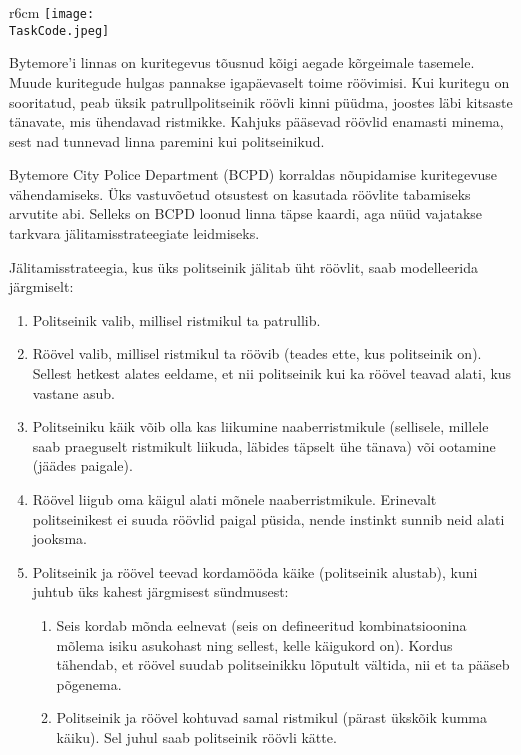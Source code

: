 \documentclass{boi2014-et}
\renewcommand{\TaskCode}{coprobber}
\begin{document}
    \begin{wrapfigure}[8]{r}{6cm}
        \vspace{-36pt}
        \texttt{[image: \\TaskCode.jpeg]}
    \end{wrapfigure}

    Bytemore'i linnas on kuritegevus tõusnud kõigi aegade kõrgeimale tasemele.
    Muude kuritegude hulgas pannakse igapäevaselt toime röövimisi.
    Kui kuritegu on sooritatud, peab üksik patrullpolitseinik röövli kinni püüdma,
    joostes läbi kitsaste tänavate, mis ühendavad ristmikke.
    Kahjuks pääsevad röövlid enamasti minema,
    sest nad tunnevad linna paremini kui politseinikud.

    Bytemore City Police Department (BCPD) korraldas nõupidamise kuritegevuse vähendamiseks.
    Üks vastuvõetud otsustest on kasutada röövlite tabamiseks arvutite abi.
    Selleks on BCPD loonud linna täpse kaardi,
    aga nüüd vajatakse tarkvara jälitamisstrateegiate leidmiseks.

    Jälitamisstrateegia, kus üks politseinik jälitab üht röövlit, saab modelleerida järgmiselt:
    \begin{enumerate}
        \item Politseinik valib, millisel ristmikul ta patrullib.
        \item Röövel valib, millisel ristmikul ta röövib (teades ette, kus politseinik on).
            Sellest hetkest alates eeldame, et nii politseinik kui ka röövel teavad alati,
            kus vastane asub.
        \item Politseiniku käik võib olla kas liikumine naaberristmikule
            (sellisele, millele saab praeguselt ristmikult liikuda,
            läbides täpselt ühe tänava) või ootamine (jäädes paigale).
        \item Röövel liigub oma käigul alati mõnele naaberristmikule.
            Erinevalt politseinikest ei suuda röövlid paigal püsida,
            nende instinkt sunnib neid alati jooksma.
        \item Politseinik ja röövel teevad kordamööda käike (politseinik alustab),
            kuni juhtub üks kahest järgmisest sündmusest:
            \begin{enumerate}
                \item Seis kordab mõnda eelnevat (seis on defineeritud kombinatsioonina mõlema isiku asukohast ning sellest, kelle käigukord on).
                    Kordus tähendab, et röövel suudab politseinikku lõputult vältida, nii et ta pääseb põgenema.
                \item Politseinik ja röövel kohtuvad samal ristmikul (pärast ükskõik kumma käiku).
                    Sel juhul saab politseinik röövli kätte.
            \end{enumerate}
    \end{enumerate}
\end{document}
